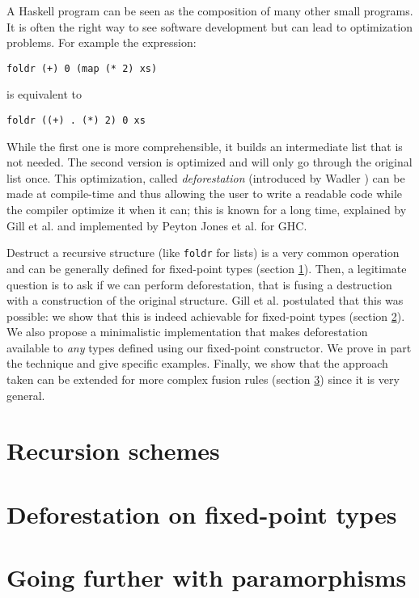 \documentclass[format=sigplan]{acmart}
\newcommand{\minline}[1]{\texttt{#1}}
\begin{document}
A Haskell program can be seen as the composition of many other small programs. It is often the right way to see software development but can lead to optimization problems. For example the expression:
\begin{verbatim}
foldr (+) 0 (map (* 2) xs)
\end{verbatim}
is equivalent to
\begin{verbatim}
foldr ((+) . (*) 2) 0 xs
\end{verbatim}

\noindent While the first one is more comprehensible, it builds an intermediate list that is not needed. The second version is optimized and will only go through the original list once.
This optimization, called \emph{deforestation} (introduced by Wadler \cite{WADLER1990231}) can be made at compile-time and thus allowing the user to write a readable code while the compiler optimize it when it can; this is known for a long time, explained by Gill et al. \cite{Gill:1993:SCD:165180.165214} and implemented by Peyton Jones et al. \cite{pbr} for GHC.

Destruct a recursive structure (like \minline{foldr} for lists) is a very common operation and can be generally defined for fixed-point types (section \ref{sec:recschemes}). Then, a legitimate question is to ask if we can perform deforestation, that is fusing a destruction with a construction of the original structure. Gill et al. \cite{Gill:1993:SCD:165180.165214} postulated that this was possible: we show that this is indeed achievable for fixed-point types (section \ref{sec:rectypes}). We also propose a minimalistic implementation that makes deforestation available to \emph{any} types defined using our fixed-point constructor. We prove in part the technique and give specific examples.
Finally, we show that the approach taken can be extended for more complex fusion rules (section \ref{sec:para}) since it is very general.

\section{Recursion schemes}
\label{sec:recschemes}


\section{Deforestation on fixed-point types}
\label{sec:rectypes}


\section{Going further with paramorphisms}
\label{sec:para}

\end{document}
